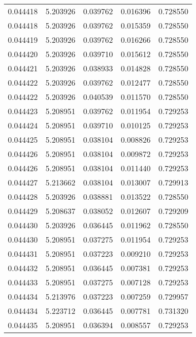 \begin{tabular}{lrrrr}
0.044418    &  5.203926 &  0.039762 &  0.016396 &             0.728550 \\
0.044418    &  5.203926 &  0.039762 &  0.015359 &             0.728550 \\
0.044419    &  5.203926 &  0.039762 &  0.016266 &             0.728550 \\
0.044420    &  5.203926 &  0.039710 &  0.015612 &             0.728550 \\
0.044421    &  5.203926 &  0.038933 &  0.014828 &             0.728550 \\
0.044422    &  5.203926 &  0.039762 &  0.012477 &             0.728550 \\
0.044422    &  5.203926 &  0.040539 &  0.011570 &             0.728550 \\
0.044423    &  5.208951 &  0.039762 &  0.011954 &             0.729253 \\
0.044424    &  5.208951 &  0.039710 &  0.010125 &             0.729253 \\
0.044425    &  5.208951 &  0.038104 &  0.008826 &             0.729253 \\
0.044426    &  5.208951 &  0.038104 &  0.009872 &             0.729253 \\
0.044426    &  5.208951 &  0.038104 &  0.011440 &             0.729253 \\
0.044427    &  5.213662 &  0.038104 &  0.013007 &             0.729913 \\
0.044428    &  5.203926 &  0.038881 &  0.013522 &             0.728550 \\
0.044429    &  5.208637 &  0.038052 &  0.012607 &             0.729209 \\
0.044430    &  5.203926 &  0.036445 &  0.011962 &             0.728550 \\
0.044430    &  5.208951 &  0.037275 &  0.011954 &             0.729253 \\
0.044431    &  5.208951 &  0.037223 &  0.009210 &             0.729253 \\
0.044432    &  5.208951 &  0.036445 &  0.007381 &             0.729253 \\
0.044433    &  5.208951 &  0.037275 &  0.007128 &             0.729253 \\
0.044434    &  5.213976 &  0.037223 &  0.007259 &             0.729957 \\
0.044434    &  5.223712 &  0.036445 &  0.007781 &             0.731320 \\
0.044435    &  5.208951 &  0.036394 &  0.008557 &             0.729253 \\

\end{tabular}
